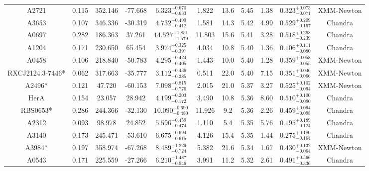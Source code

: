 \documentclass{aa}   %
\begin{document}
\begin{table}[h!]
\begin{center}
\begin{tabular}{ c  c  c  c c c c c c c c }
A2721               		&		0.115	&	352.146	&	-77.668	& $	6.323^{+0.670}_{-0.633}$  &      1.822	&  13.6	&	5.45	&	1.38	&	$ 0.323^{+0.073}_{-0.071}  $ &	  XMM-Newton  \\
A3653               		&		0.107	&	346.336	&	-30.319	& $	4.732^{+0.499}_{-0.412}$  &      1.581	&  14.3	&	5.42	&	4.99	&	$ 0.529^{+0.209}_{-0.167}  $ &	  Chandra     \\
A0697               		&		0.282	&	186.363	&	37.261	& $ 14.527^{+1.851}_{-1.579}$ &     11.803	&  15.6	&	5.41	&	3.28	&	$ 0.518^{+0.268}_{-0.239}  $ &	  Chandra     \\
A1204               		&		0.171	&	230.650	&	65.454	& $	3.974^{+0.325}_{-0.397}$  &      4.034	&  10.8	&	5.40	&	1.36	&	$ 0.106^{+0.111}_{-0.080}  $ &	  Chandra     \\
A0458               		&		0.106	&	218.840	&	-50.783	& $	4.295^{+0.424}_{-0.405}$  &      1.443	&  10.0	&	5.40	&	1.28	&	$ 0.359^{+0.058}_{-0.055}  $ &	  XMM-Newton  \\
RXCJ2124.3-7446*    		&		0.062	&	317.663	&	-35.777	& $	3.112^{+0.436}_{-0.385}$  &      0.511	&  22.0	&	5.40	&	7.15	&	$ 0.351^{+0.046}_{-0.066}  $ &	 XMM-Newton   \\
A2496*              		&		0.121	&	47.720	&	-60.153	& $	7.098^{+0.815}_{-0.776}$  &      2.015	&  21.0	&	5.37	&	3.27	&	$ 0.525^{+0.102}_{-0.094}  $ &	  XMM-Newton  \\
HerA                		&		0.154	&	23.057	&	28.942	& $	4.199^{+0.203}_{-0.172}$  &      3.490	&  10.8	&	5.36	&	8.60	&	$ 0.510^{+0.100}_{-0.080}  $ &	 Chandra      \\
RBS0653*            		&		0.286	&	244.366	&	-32.130	& $ 10.090^{+0.690}_{-0.480}$ &     11.926	&  9.2	&	5.36	&	2.26	&	$ 0.459^{+0.094}_{-0.098}  $ &	  Chandra     \\
A2312               		&		0.093	&	98.978	&	24.852	& $	5.596^{+0.459}_{-0.474}$  &      1.110	&  5.4	&	5.35	&	5.76	&	$ 0.195^{+0.189}_{-0.124}  $ &	  Chandra     \\
A3140               		&		0.173	&	245.471	&	-53.610	& $	6.675^{+0.694}_{-0.615}$  &      4.126	&  15.4	&	5.35	&	1.44	&	$ 0.275^{+0.180}_{-0.164}  $ &	  Chandra     \\
A3984*              		&		0.197	&	358.974	&	-67.268	& $	8.489^{+1.229}_{-0.724}$  &      5.382	&  21.6	&	5.34	&	1.67	&	$ 0.430^{+0.132}_{-0.064}  $ &	  XMM-Newton  \\
A0543               		&		0.171	&	225.559	&	-27.266	& $	6.210^{+1.487}_{-0.946}$  &      3.991	&  11.2	&	5.32	&	2.61	&	$ 0.491^{+0.566}_{-0.336}  $ &	  Chandra     \\

\end{tabular}
\end{center}
\end{table}
\end{document}
